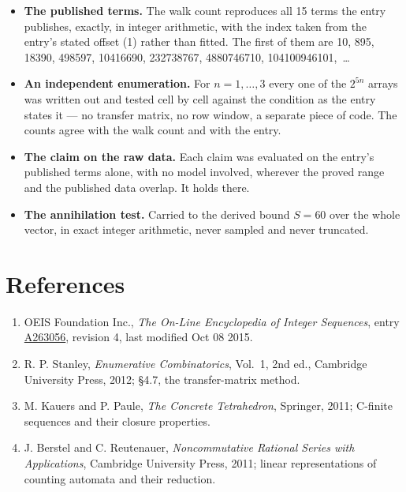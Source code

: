 \documentclass[11pt]{article}
\theoremstyle{definition}
\begin{document}
\begin{itemize}

\item {\bfseries The published terms.} The walk count reproduces all 15 terms the entry publishes, exactly, in integer arithmetic, with the index taken from the entry's stated offset (1) rather than fitted. The first of them are 10, 895, 18390, 498597, 10416690, 232738767, 4880746710, 104100946101,~\dots

\item {\bfseries An independent enumeration.} For $n = 1,\dots,3$ every one of the $2^{5n}$ arrays was written out and tested cell by cell against the condition as the entry states it --- no transfer matrix, no row window, a separate piece of code. The counts agree with the walk count and with the entry.

\item {\bfseries The claim on the raw data.} Each claim was evaluated on the entry's published terms alone, with no model involved, wherever the proved range and the published data overlap. It holds there.

\item {\bfseries The annihilation test.} Carried to the derived bound $S = 60$ over the whole vector, in exact integer arithmetic, never sampled and never truncated.

\end{itemize}

\section{References}

\begin{enumerate}

\item OEIS Foundation Inc., \emph{The On-Line Encyclopedia of Integer Sequences}, entry \href{https://oeis.org/A263056}{A263056}, revision 4, last modified Oct 08 2015.

\item R. P. Stanley, \emph{Enumerative Combinatorics}, Vol.~1, 2nd ed., Cambridge University Press, 2012; \S4.7, the transfer-matrix method.

\item M. Kauers and P. Paule, \emph{The Concrete Tetrahedron}, Springer, 2011; C-finite sequences and their closure properties.

\item J. Berstel and C. Reutenauer, \emph{Noncommutative Rational Series with Applications}, Cambridge University Press, 2011; linear representations of counting automata and their reduction.

\end{enumerate}
\end{document}
